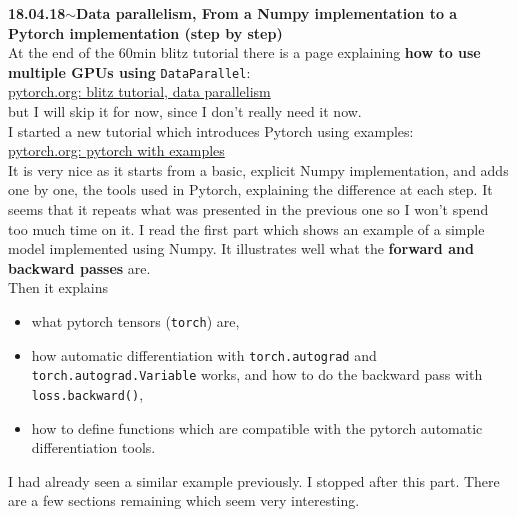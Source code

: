 \documentclass[11pt,a4paper]{article}
\newenvironment{loggentry}[2]%
{\noindent\textbf{#1}\hspace{1cm}$\mathbf{\sim}$\text{ }\textbf{#2}\\}{\vspace{0.5cm}}
\begin{document}
\begin{loggentry}{18.04.18}{Data parallelism, From a Numpy implementation to a Pytorch implementation (step by step)}
At the end of the 60min blitz tutorial there is a page explaining \textbf{how to use multiple GPUs using} \texttt{DataParallel}:\\
\href{http://pytorch.org/tutorials/beginner/blitz/data_parallel_tutorial.html}{pytorch.org: blitz tutorial, data parallelism}\\
but I will skip it for now, since I don't really need it now.\\
I started a new tutorial which introduces Pytorch using examples:\\
\href{http://pytorch.org/tutorials/beginner/pytorch_with_examples.html#pytorch-variables-and-autograd}{pytorch.org: pytorch with examples}\\
It is very nice as it starts from a basic, explicit Numpy implementation, and adds one by one, the tools used in Pytorch, explaining the difference at each step. It seems that it repeats what was presented in the previous one so I won't spend too much time on it. I read the first part which shows an example of a simple model implemented using Numpy. It illustrates well what the \textbf{forward and backward passes} are.\\
Then it explains
\begin{itemize}
\item what pytorch tensors (\texttt{torch}) are,
\item how automatic differentiation with \texttt{torch.autograd} and \texttt{torch.autograd.Variable} works, and how to do the backward pass with \texttt{loss.backward()},
\item how to define functions which are compatible with the pytorch automatic differentiation tools.
\end{itemize}
I had already seen a similar example previously. I stopped after this part. There are a few sections remaining which seem very interesting.
\end{loggentry}
\end{document}
